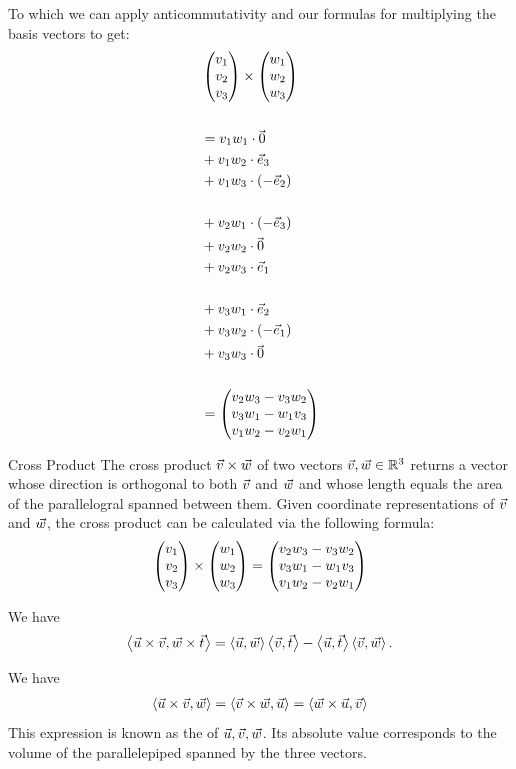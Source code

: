 To which we can apply anticommutativity and our formulas for multiplying the basis vectors to get:
\begin{align*}
	&\begin{pmatrix} v_1\\v_2\\v_3\end{pmatrix} \times \begin{pmatrix} w_1\\w_2\\w_3\end{pmatrix}\\\\
	&=
	v_1w_1 \cdot \kern-1.2pt\vec{\kern1.2pt 0}\\
	&+
	v_1w_2 \cdot \vec{e}_3\\
	&+
	v_1w_3 \cdot (- \vec{e}_2)\\\\
	&+
	v_2w_1 \cdot (- \vec{e}_3)\\
	&+
	v_2w_2 \cdot \kern-1.2pt\vec{\kern1.2pt 0}\\
	&+
	v_2w_3 \cdot \vec{e}_1\\\\
	&+
	v_3w_1 \cdot \vec{e}_2\\
	&+
	v_3w_2 \cdot (-\vec{e}_1)\\
	&+
	v_3w_3 \cdot \kern-1.2pt\vec{\kern1.2pt 0}\\\\
	&= \begin{pmatrix} v_2w_3 - v_3w_2\\v_3w_1 - w_1v_3\\v_1w_2 - v_2w_1\end{pmatrix}
\end{align*}
\begin{importantcorollary}{Cross Product}{}
	The cross product $\vec{v} \times \vec{w}$ of two vectors $\vec{v}, \vec{w} \in \mathbb{R}^3$ returns a vector whose direction is orthogonal to both $\vec{v}$ and $\vec{w}$ and whose length equals the area of the parallelogral spanned between them. Given coordinate representations of $\vec{v}$ and $\vec{w}$, the cross product can be calculated via the following formula:
	\begin{align*}
		\begin{pmatrix} v_1\\v_2\\v_3\end{pmatrix} \times \begin{pmatrix} w_1\\w_2\\w_3\end{pmatrix}
		=
		\begin{pmatrix} v_2w_3 - v_3w_2\\v_3w_1 - w_1v_3\\v_1w_2 - v_2w_1\end{pmatrix}
	\end{align*}
\end{importantcorollary}
\newpar
\begin{proposition}
	We have
	\begin{align*}
		\left\langle \vec{u} \times \vec{v}, \vec{w} \times \vec{t} \right\rangle = \left\langle \vec{u}, \vec{w} \right\rangle\left\langle \vec{v}, \vec{t} \right\rangle - \left\langle \vec{u}, \vec{t} \right\rangle\left\langle \vec{v}, \vec{w} \right\rangle.
	\end{align*}
\end{proposition}
\begin{proposition}
	We have
	\begin{align*}
		\left\langle \vec{u} \times \vec{v}, \vec{w} \right\rangle = \left\langle \vec{v} \times \vec{w}, \vec{u} \right\rangle = \left\langle \vec{w} \times \vec{u}, \vec{v} \right\rangle
	\end{align*}
	This expression is known as the  of $\vec{u}, \vec{v}, \vec{w}$. Its absolute value corresponds to the volume of the parallelepiped spanned by the three vectors.
\end{proposition}
